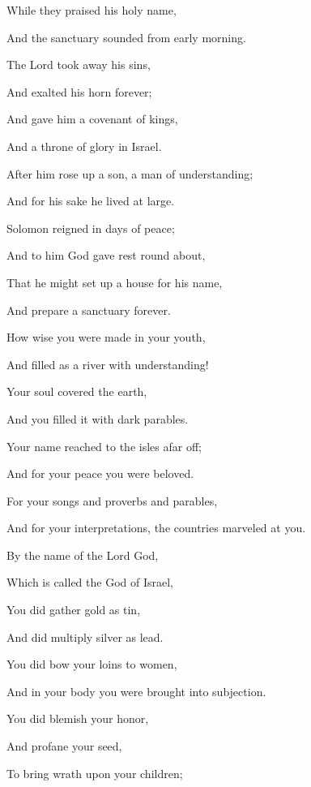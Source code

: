 {\par }{\Q While they praised his holy name,
\par }{\Q And the sanctuary sounded from early morning.
\par }{\Q {}The Lord took away his sins,
\par }{\Q And exalted his horn forever;
\par }{\Q And gave him a covenant of kings,
\par }{\Q And a throne of glory in Israel.
\par }{\Q {}After him rose up a son, a man of understanding;
\par }{\Q And for his sake he lived at large.
\par }{\Q {}Solomon reigned in days of peace;
\par }{\Q And to him God gave rest round about,
\par }{\Q That he might set up a house for his name,
\par }{\Q And prepare a sanctuary forever.
\par }{\Q {}How wise you were made in your youth,
\par }{\Q And filled as a river with understanding!
\par }{\Q {}Your soul covered the earth,
\par }{\Q And you filled it with
 dark parables.
\par }{\Q {}Your name reached to the isles afar off;
\par }{\Q And for your peace you were beloved.
\par }{\Q {}For your songs and proverbs and parables,
\par }{\Q And for your interpretations, the countries marveled at you.
\par }{\Q {}By the name of the Lord God,
\par }{\Q Which is called the God of Israel,
\par }{\Q You did gather gold as tin,
\par }{\Q And did multiply silver as lead.
\par }{\Q {}You did bow your loins to women,
\par }{\Q And in your body you were brought into subjection.
\par }{\Q {}You did blemish your honor,
\par }{\Q And profane your seed,
\par }{\Q To bring wrath upon your children;
}
